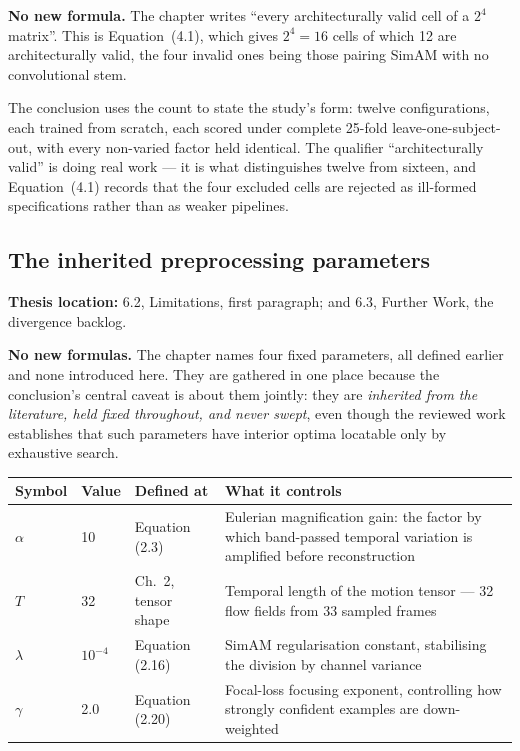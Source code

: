 \documentclass[11pt,a4paper]{article}
\numberwithin{equation}{section}
\begin{document}
\textbf{No new formula.} The chapter writes ``every architecturally valid cell
of a $2^4$ matrix''. This is Equation~(4.1), which gives $2^4 = 16$ cells of
which 12 are architecturally valid, the four invalid ones being those pairing
SimAM with no convolutional stem.

The conclusion uses the count to state the study's form: twelve configurations,
each trained from scratch, each scored under complete 25-fold
leave-one-subject-out, with every non-varied factor held identical. The
qualifier ``architecturally valid'' is doing real work --- it is what
distinguishes twelve from sixteen, and Equation~(4.1) records that the four
excluded cells are rejected as ill-formed specifications rather than as
weaker pipelines.

\subsection{The inherited preprocessing parameters}
\label{fg6:inherited}
\textbf{Thesis location:} 6.2, Limitations, first paragraph; and 6.3, Further
Work, the divergence backlog.

\textbf{No new formulas.} The chapter names four fixed parameters, all
defined earlier and none introduced here. They are gathered in one place
because the conclusion's central caveat is about them jointly: they are
\emph{inherited from the literature, held fixed throughout, and never swept},
even though the reviewed work establishes that such parameters have interior
optima locatable only by exhaustive search.

\begin{center}
\begin{tabular}{@{}l l l p{5.4cm}@{}}
\hline
\textbf{Symbol} & \textbf{Value} & \textbf{Defined at} & \textbf{What it controls} \\
\hline
$\alpha$  & 10        & Equation (2.3)  & Eulerian magnification gain: the factor by which band-passed temporal variation is amplified before reconstruction \\
$T$       & 32        & Ch.\ 2, tensor shape & Temporal length of the motion tensor --- 32 flow fields from 33 sampled frames \\
$\lambda$ & $10^{-4}$ & Equation (2.16) & SimAM regularisation constant, stabilising the division by channel variance \\
$\gamma$  & 2.0       & Equation (2.20) & Focal-loss focusing exponent, controlling how strongly confident examples are down-weighted \\
\hline
\end{tabular}
\end{center}
\end{document}
